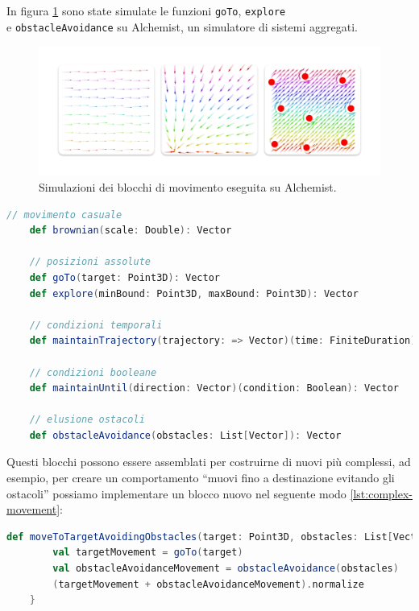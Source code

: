 \documentclass[12pt,a4paper,openright,twoside]{book}
\begin{document}
In figura \cref{fig:movement-simulations} \cite{Macroswarm} sono state simulate le funzioni \verb|goTo|, \verb|explore| \\ e \verb|obstacleAvoidance| su Alchemist, un simulatore di sistemi aggregati.

\begin{figure}
    \centering
    \includegraphics[width=.9\linewidth]{figures/movement-simulations.pdf}
    \caption{Simulazioni dei blocchi di movimento eseguita su Alchemist.}
    \label{fig:movement-simulations}
\end{figure}

\begin{lstlisting}[language=Scala, label={lst:movement-module}, caption={Funzioni del modulo di movimento}]
    // movimento casuale
    def brownian(scale: Double): Vector
    
    // posizioni assolute
    def goTo(target: Point3D): Vector
    def explore(minBound: Point3D, maxBound: Point3D): Vector

    // condizioni temporali
    def maintainTrajectory(trajectory: => Vector)(time: FiniteDuration):Vector

    // condizioni booleane
    def maintainUntil(direction: Vector)(condition: Boolean): Vector

    // elusione ostacoli
    def obstacleAvoidance(obstacles: List[Vector]): Vector
\end{lstlisting}

Questi blocchi possono essere assemblati per costruirne di nuovi più complessi, ad esempio, per creare un comportamento ``muovi fino a destinazione evitando gli ostacoli'' possiamo implementare un blocco nuovo nel seguente modo \cref{lst:complex-movement}:

\begin{lstlisting}[language=Scala, label={lst:complex-movement}, caption={Comportamento complesso}]
    def moveToTargetAvoidingObstacles(target: Point3D, obstacles: List[Vector]): Vector = {
        val targetMovement = goTo(target)
        val obstacleAvoidanceMovement = obstacleAvoidance(obstacles)
        (targetMovement + obstacleAvoidanceMovement).normalize
    }
\end{lstlisting}
\end{document}
